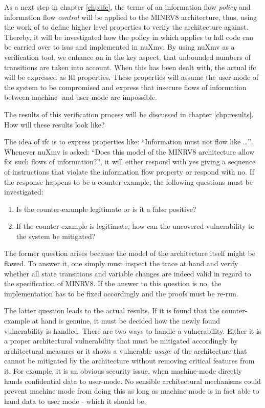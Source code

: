 As a next step in chapter \ref{chp:ifc}, the terms of an information flow \textit{policy} and information flow \textit{control} will be applied to the MINRV8 architecture, thus, using the work of \citeauthor{Ferraiuolo17} \cite{Ferraiuolo17} to define higher level properties to verify the architecture against.
Thereby, it will be investigated how the policy in \cite{Ferraiuolo17} which applies to \gls{hdl} code can be carried over to \glspl{isa} and implemented in nuXmv.
By using nuXmv as a verification tool, we enhance on \cite{Reid17} in the key aspect, that unbounded numbers of transitions are taken into account.
When this has been dealt with, the actual \gls{ifc} will be expressed as \gls{ltl} properties.
These properties will assume the user-mode of the system to be compromised and express that insecure flows of information between machine- and user-mode are impossible.

The results of this verification process will be discussed in chapter \ref{chp:results}.
How will these results look like?

The idea of \gls{ifc} is to express properties like: \enquote{Information must not flow like \dots}.
Whenever nuXmv is asked: \enquote{Does this model of the MINRV8 architecture allow for such flows of information?}, it will either respond with yes giving a sequence of instructions that violate the information flow property or respond with no.
If the response happens to be a counter-example, the following questions must be investigated:
\begin{enumerate}
    \item \label{itm:counter-ex-validity}
    Is the counter-example legitimate or is it a false positive?
    \item \label{itm:counter-ex-mitigation}
    If the counter-example is legitimate, how can the uncovered vulnerability to the system be mitigated?
\end{enumerate}

The former question arises because the model of the architecture itself might be flawed.
To answer it, one simply must inspect the trace at hand and verify whether all state transitions and variable changes are indeed valid in regard to the specification of MINRV8.
If the answer to this question is no, the implementation has to be fixed accordingly and the proofs must be re-run.

The latter question leads to the actual results.
If it is found that the counter-example at hand is genuine, it must be decided how the newly found vulnerability is handled.
There are two ways to handle a vulnerability.
Either it is a proper architectural vulnerability that must be mitigated accordingly by architectural measures or it shows a vulnerable \textit{usage} of the architecture that cannot be mitigated by the architecture without removing critical features from it.
For example, it is an obvious security issue, when machine-mode directly hands confidential data to user-mode.
No sensible architectural mechanisms could prevent machine mode from doing this as long as machine mode is in fact able to hand data to user mode - which it should be.

